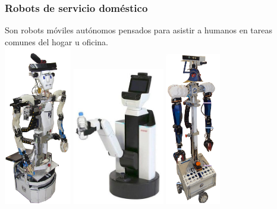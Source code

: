 \documentclass[10pt,spanish,aspectratio=1610]{beamer}
\begin{document}
\begin{frame}\frametitle{Robots de servicio doméstico}
  \centering
  Son robots móviles autónomos pensados para asistir a humanos en tareas comunes del hogar u oficina.\\
  \includegraphics[width=0.22\textwidth]{Figures/GolemIII.png}
  \includegraphics[width=0.3\textwidth]{Figures/HSR.jpg}
  \includegraphics[width=0.18\textwidth]{Figures/Justina.png}
\end{frame}
\end{document}
